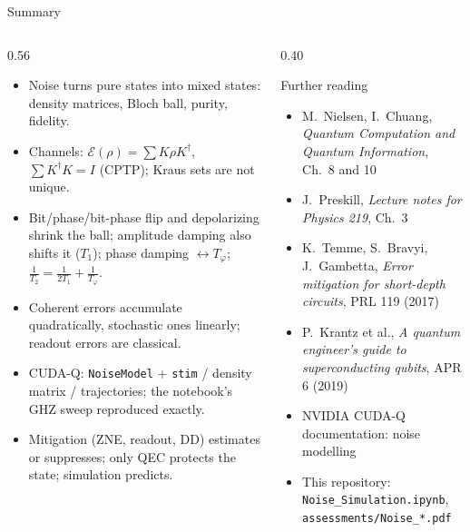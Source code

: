 \documentclass[aspectratio=169,11pt]{beamer}
\newcommand{\E}{\mathcal E}
\begin{document}
\begin{frame}{Summary}
  \begin{columns}[T]
    \begin{column}{0.56\textwidth}
      \footnotesize
      \begin{itemize}\itemsep1pt
        \item Noise turns pure states into mixed states: density matrices, Bloch ball, purity, fidelity.
        \item Channels: $\E(\rho) = \sum K\rho K^\dagger$, $\sum K^\dagger K = I$ (CPTP); Kraus sets are not unique.
        \item Bit/phase/bit-phase flip and depolarizing shrink the ball; amplitude damping also shifts it ($T_1$); phase damping $\leftrightarrow T_\varphi$; $\frac1{T_2} = \frac1{2T_1} + \frac1{T_\varphi}$.
        \item Coherent errors accumulate quadratically, stochastic ones linearly; readout errors are classical.
        \item CUDA-Q: \texttt{NoiseModel} + \texttt{stim} / density matrix / trajectories; the notebook's GHZ sweep reproduced exactly.
        \item Mitigation (ZNE, readout, DD) estimates or suppresses; only QEC protects the state; simulation predicts.
      \end{itemize}
    \end{column}
    \begin{column}{0.40\textwidth}
      \begin{block}{Further reading}
        \scriptsize
        \begin{itemize}\itemsep0pt
          \item M.\ Nielsen, I.\ Chuang, \emph{Quantum Computation and Quantum Information}, Ch.~8 and 10
          \item J.\ Preskill, \emph{Lecture notes for Physics 219}, Ch.~3
          \item K.\ Temme, S.\ Bravyi, J.\ Gambetta, \emph{Error mitigation for short-depth circuits}, PRL 119 (2017)
          \item P.\ Krantz et al., \emph{A quantum engineer's guide to superconducting qubits}, APR 6 (2019)
          \item NVIDIA CUDA-Q documentation: noise modelling
          \item This repository: \texttt{Noise\_Simulation.ipynb}, \texttt{assessments/Noise\_*.pdf}
        \end{itemize}
      \end{block}
    \end{column}
  \end{columns}
\end{frame}
\end{document}
